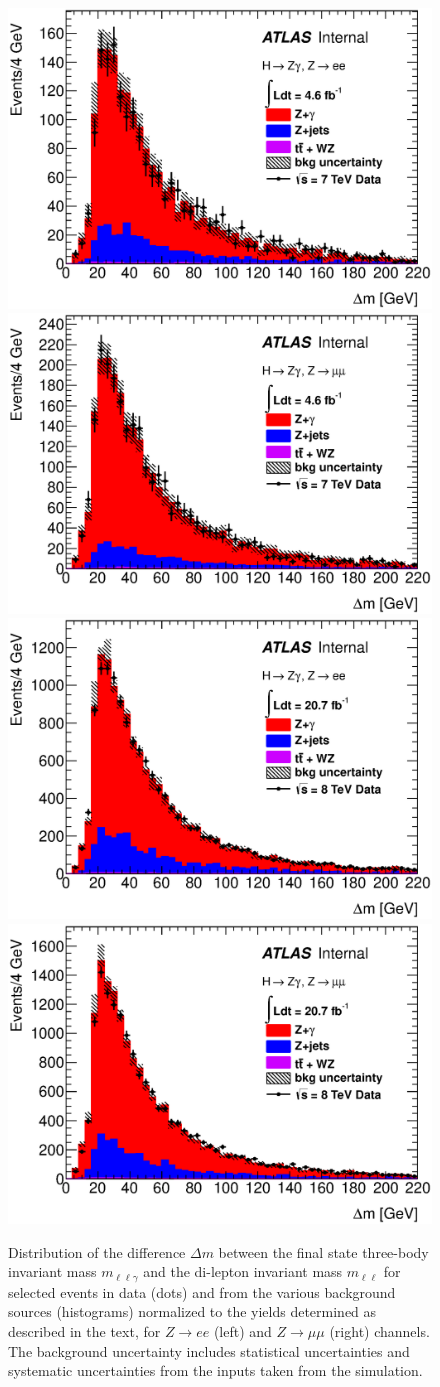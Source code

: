 \begin{figure}[!htbp]
  \begin{center}
    \includegraphics[width=0.49\columnwidth]{figures/bkg_decomposition_2011_e_dMllg_Z_PV_corr_linscale}
    \includegraphics[width=0.49\columnwidth]{figures/bkg_decomposition_2011_mu_dMllg_Z_PV_corr_linscale}
    \includegraphics[width=0.49\columnwidth]{figures/bkg_decomposition_2012_e_dMllg_Z_PV_corr_linscale}
    \includegraphics[width=0.49\columnwidth]{figures/bkg_decomposition_2012_mu_dMllg_Z_PV_corr_linscale}
    \caption{Distribution of the difference $\Delta m$ 
      between the final state three-body invariant mass
      $m_{\ell\ell\gamma}$ and the di-lepton invariant mass
      $m_{\ell\ell}$ for selected events in data (dots) and from
      the various background sources (histograms) normalized to the yields determined 
      as described in the text, for $Z\to ee$ (left) and $Z\to\mu\mu$ (right) channels.
      The background uncertainty includes statistical uncertainties and systematic
      uncertainties from the inputs taken from the simulation.
    }
    \label{fig:Dm_mass_linear}
  \end{center}
\end{figure}

